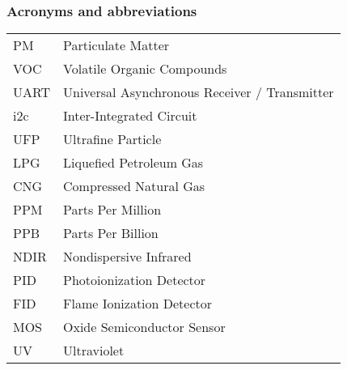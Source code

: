 \subsubsection*{Acronyms and abbreviations}

\begingroup
\renewcommand{\arraystretch}{1.2}
\begin{tabular}{@{}p{2.5cm} l}

	PM		& Particulate Matter\\
	VOC		& Volatile Organic Compounds\\
	UART	& Universal Asynchronous Receiver / Transmitter\\
	i2c		& Inter-Integrated Circuit\\
	UFP		& Ultrafine Particle\\
	LPG		& Liquefied Petroleum Gas\\
	CNG 	& Compressed Natural Gas\\
	PPM		& Parts Per Million\\
	PPB		& Parts Per Billion\\
	NDIR	& Nondispersive Infrared\\
	PID		& Photoionization Detector\\
	FID		& Flame Ionization Detector\\
	MOS		& Oxide Semiconductor Sensor\\
	UV		& Ultraviolet\\
	
	
\end{tabular}
\endgroup
